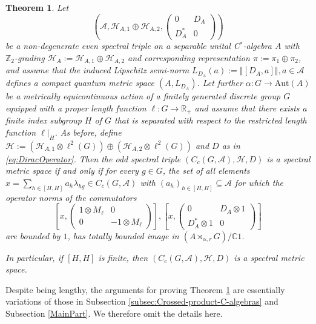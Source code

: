 \documentclass[a4paper,11pt,reqno]{amsart}
\numberwithin{equation}{section}
\numberwithin{equation}{section}
\newtheorem{theorem}{Theorem}[section]
\theoremstyle{definition}
\theoremstyle{remark}
\theoremstyle{remark}
\begin{document}
\begin{theorem} \label{MainTheorem2} Let
\[
\left(\mathcal{A},\mathcal{H}_{A,1}\oplus\mathcal{H}_{A,2},\left(\begin{array}{cc}
0 & D_{A}\\
D_{A}^{\ast} & 0
\end{array}\right)\right)
\]
be a non-degenerate even spectral triple on a separable unital C$^{\ast}$-algebra
$A$ with $\mathbb{Z}_{2}$-grading $\mathcal{H}_{A}:=\mathcal{H}_{A,1}\oplus\mathcal{H}_{A,2}$
and corresponding representation $\pi:=\pi_{1}\oplus\pi_{2}$, and
assume that the induced Lipschitz semi-norm $L_{D_{A}}(a):=\left\Vert [D_{A},a]\right\Vert ,a\in\mathcal{A}$
defines a compact quantum metric space $(A,L_{D_{A}})$. Let further
$\alpha:G\rightarrow\text{Aut}(A)$ be a metrically equicontinuous
action of a finitely generated discrete group $G$ equipped with a
proper length function $\ell:G\rightarrow\mathbb{R}_{+}$ and assume
that there exists a finite index subgroup $H$ of $G$ that is separated
with respect to the restricted length function $\ell|_{H}$. As before,
define $\mathcal{H}:=(\mathcal{H}_{A,1}\otimes\ell^{2}(G))\oplus(\mathcal{H}_{A,2}\otimes\ell^{2}(G))$
and $D$ as in \eqref{eq:DiracOperator}. Then the odd spectral triple
$(C_{c}(G,\mathcal{A}),\mathcal{H},D)$ is a spectral metric space
if and only if for every $g\in G$, the set of all elements $x=\sum_{h\in[H,H]}a_{h}\lambda_{hg}\in C_{c}(G,\mathcal{A})$
with $(a_{h})_{h\in[H,H]}\subseteq\mathcal{A}$ for which the operator norms of the commutators
\[
\left[x,\left(\begin{array}{cc}
1\otimes M_{\ell} & 0\\
0 & -1\otimes M_{\ell}
\end{array}\right)\right],\left[x,\left(\begin{array}{cc}
0 & D_{A}\otimes1\\
D_{A}^{\ast}\otimes1 & 0
\end{array}\right)\right]
\]
are bounded by $1$, has totally bounded image in $(A\rtimes_{\alpha,r}G)/\mathbb{C}1$.

In particular, if $[H,H]$ is finite, then $(C_{c}(G,\mathcal{A}),\mathcal{H},D)$
is a spectral metric space. \end{theorem}

Despite being lengthy, the arguments for proving Theorem \ref{MainTheorem2}
are essentially variations of those in Subsection \ref{subsec:Crossed-product-C-algebras}
and Subsection \ref{MainPart}. We therefore omit the details here. \\
\end{document}
